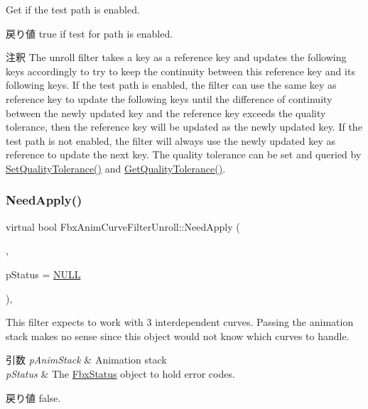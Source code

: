 Get if the test path is enabled. \begin{DoxyReturn}{戻り値}
{\ttfamily true} if test for path is enabled. 
\end{DoxyReturn}
\begin{DoxyRemark}{注釈}
The unroll filter takes a key as a reference key and updates the following keys accordingly to try to keep the continuity between this reference key and its following keys. If the test path is enabled, the filter can use the same key as reference key to update the following keys until the difference of continuity between the newly updated key and the reference key exceeds the quality tolerance, then the reference key will be updated as the newly updated key. If the test path is not enabled, the filter will always use the newly updated key as reference to update the next key. The quality tolerance can be set and queried by \hyperlink{class_fbx_anim_curve_filter_unroll_ad8570bf12f5c397fb975fe961aeed29f}{Set\+Quality\+Tolerance()} and \hyperlink{class_fbx_anim_curve_filter_unroll_a881a4c7122073deec59ab208b2bdf95a}{Get\+Quality\+Tolerance()}. 
\end{DoxyRemark}
\mbox{\label{class_fbx_anim_curve_filter_unroll_a8380c6817fbf19d347b0bd0b5ae9a57b}} 
\subsubsection{\texorpdfstring{Need\+Apply()}{NeedApply()}\hspace{0.1cm}{\footnotesize\ttfamily [1/5]}}
{\footnotesize\ttfamily virtual bool Fbx\+Anim\+Curve\+Filter\+Unroll\+::\+Need\+Apply (\begin{DoxyParamCaption}\item[{\hyperlink{class_fbx_anim_stack}{Fbx\+Anim\+Stack} $\ast$}]{,  }\item[{\hyperlink{class_fbx_status}{Fbx\+Status} $\ast$}]{p\+Status = {\ttfamily \hyperlink{fbxarch_8h_a070d2ce7b6bb7e5c05602aa8c308d0c4}{N\+U\+LL}} }\end{DoxyParamCaption})\hspace{0.3cm}{\ttfamily [inline]}, {\ttfamily [virtual]}}

This filter expects to work with 3 interdependent curves. Passing the animation stack makes no sense since this object would not know which curves to handle. 
\begin{DoxyParams}{引数}
{\em p\+Anim\+Stack} & Animation stack \\
\hline
{\em p\+Status} & The \hyperlink{class_fbx_status}{Fbx\+Status} object to hold error codes. \\
\hline
\end{DoxyParams}
\begin{DoxyReturn}{戻り値}
{\ttfamily false}. 
\end{DoxyReturn}


